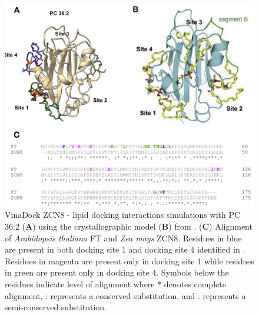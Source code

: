 \documentclass[9pt,twocolumn,twoside,lineno]{biorxiv}
\begin{document}
\clearpage

\begin{figure}[t]
\begin{center}
\includegraphics[width=0.8 \paperwidth]{Sup_Figures/Sup_Fig_12.png}
\caption{ VinaDock \cite{Trott2010-su} ZCN8 - lipid docking interactions simulations with PC 36:2 (\textbf{A}) using the crystallographic model (\textbf{B}) from \cite{Nakamura2019-ht}. 
(\textbf{C}) Alignment of \textit{Arabidopsis thaliana} FT and \textit{Zea mays} ZCN8. 
Residues in blue are present in both docking site 1 and docking site 4 identified in \cite{Nakamura2019-ht}. 
Residues in magenta are present only in docking site 1 while residues in green are present only in docking site 4. 
Symbols below the residues indicate level of alignment where * denotes complete alignment, : represents a conserved substitution, and . represents a semi-conserved substitution.}
\label{figure:Sup:Docking}
\end{center}
\end{figure} 

\clearpage
\end{document}
